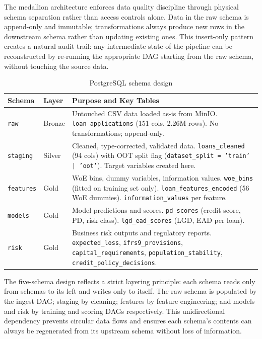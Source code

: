 \documentclass[12pt,a4paper]{report}
\begin{document}
\medskip
\noindent The medallion architecture enforces data quality discipline through physical schema separation rather than access controls alone. Data in the raw schema is append-only and immutable; transformations always produce new rows in the downstream schema rather than updating existing ones. This insert-only pattern creates a natural audit trail: any intermediate state of the pipeline can be reconstructed by re-running the appropriate DAG starting from the raw schema, without touching the source data.

\begin{table}[H]
\centering
\caption{PostgreSQL schema design}
\label{tab:schemas}
\begin{tabularx}{\textwidth}{llX}
\toprule
\textbf{Schema} & \textbf{Layer} & \textbf{Purpose and Key Tables} \\
\midrule
\texttt{raw}      & Bronze & Untouched CSV data loaded as-is from MinIO. \texttt{loan\_applications} (151 cols, 2.26M rows). No transformations; append-only. \\
\texttt{staging}  & Silver & Cleaned, type-corrected, validated data. \texttt{loans\_cleaned} (94 cols) with OOT split flag (\texttt{dataset\_split = 'train' | 'oot'}). Target variables created here. \\
\texttt{features} & Gold   & WoE bins, dummy variables, information values. \texttt{woe\_bins} (fitted on training set only). \texttt{loan\_features\_encoded} (56 WoE dummies). \texttt{information\_values} per feature. \\
\texttt{models}   & Gold   & Model predictions and scores. \texttt{pd\_scores} (credit score, PD, risk class). \texttt{lgd\_ead\_scores} (LGD, EAD per loan). \\
\texttt{risk}     & Gold   & Business risk outputs and regulatory reports. \texttt{expected\_loss}, \texttt{ifrs9\_provisions}, \texttt{capital\_requirements}, \texttt{population\_stability}, \texttt{credit\_policy\_decisions}. \\
\bottomrule
\end{tabularx}
\end{table}

\medskip
\noindent The five-schema design reflects a strict layering principle: each schema reads only from schemas to its left and writes only to itself. The raw schema is populated by the ingest DAG; staging by cleaning; features by feature engineering; and models and risk by training and scoring DAGs respectively. This unidirectional dependency prevents circular data flows and ensures each schema's contents can always be regenerated from its upstream schema without loss of information.
\end{document}

